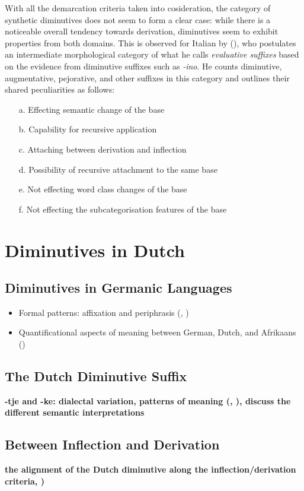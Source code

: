 With all the demarcation criteria taken into cosideration, the category of synthetic diminutives does not seem to form a clear case: while there is a noticeable overall tendency towards derivation, diminutives seem to exhibit properties from both domains. This is observed for Italian by \citeauthor{Scalise+1986} (\citeyear{Scalise+1986}), who postulates an intermediate morphological category of what he calls \textit{evaluative suffixes} based on the evidence from diminutive suffixes such as \textit{-ino}. He counts diminutive, augmentative, pejorative, and other suffixes in this category and outlines their shared peculiarities as follows:

\begin{enumerate}
\item[a.] Effecting semantic change of the base
\item[b.] Capability for recursive application
\item[c.] Attaching between derivation and inflection
\item[d.] Possibility of recursive attachment to the same base
\item[e.] Not effecting word class changes of the base
\item[f.] Not effecting the subcategorisation features of the base
\end{enumerate}



\section{Diminutives in Dutch}
\label{sec:dutchdimsuffix}
\subsection{Diminutives in Germanic Languages}
\begin{itemize}
\item Formal patterns: affixation and periphrasis (\cite{Alexiadou+Lohndal}, \cite{Schneider+2003})
\item Quantificational aspects of meaning between German, Dutch, and Afrikaans (\cite{DeBelder+2011a}) 
\end{itemize}
\subsection{The Dutch Diminutive Suffix}
\textbf{-tje and -ke: dialectal variation, patterns of meaning (\cite{VanderHulst+2008}, \cite{DeBelder+2022}), discuss the different semantic interpretations}
\subsection{Between Inflection and Derivation}
\textbf{the alignment of the Dutch diminutive along the inflection/derivation criteria, \cite{Booij+2000})}